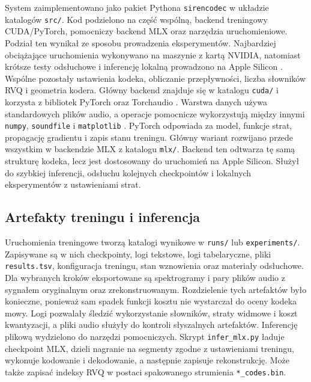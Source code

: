 System zaimplementowano jako pakiet Pythona \texttt{sirencodec} w układzie katalogów \texttt{src/}. Kod podzielono na część wspólną, backend treningowy CUDA/PyTorch, pomocniczy backend MLX oraz narzędzia uruchomieniowe. Podział ten wynikał ze sposobu prowadzenia eksperymentów. Najbardziej obciążające uruchomienia wykonywano na maszynie z kartą NVIDIA, natomiast krótsze testy odsłuchowe i inferencję lokalną prowadzono na Apple Silicon \cite{Apple2026MLX}. Wspólne pozostały ustawienia kodeka, obliczanie przepływności, liczba słowników RVQ i geometria kodera. Główny backend znajduje się w katalogu \texttt{cuda/} i korzysta z bibliotek PyTorch oraz Torchaudio \cite{Paszke2019PyTorch,PyTorch2026Torchaudio}. Warstwa danych używa standardowych plików audio, a operacje pomocnicze wykorzystują między innymi \texttt{numpy}, \texttt{soundfile} i \texttt{matplotlib} \cite{Harris2020ArrayProgramming,SoundFile2026Documentation,Hunter2007Matplotlib}. PyTorch odpowiada za model, funkcje strat, propagację gradientu i zapis stanu treningu. Główny wariant rozwijano przede wszystkim w backendzie MLX z katalogu \texttt{mlx/}. Backend ten odtwarza tę samą strukturę kodeka, lecz jest dostosowany do uruchomień na Apple Silicon. Służył do szybkiej inferencji, odsłuchu kolejnych checkpointów i lokalnych eksperymentów z ustawieniami strat.

\newpage

\subsection{Artefakty treningu i inferencja}

Uruchomienia treningowe tworzą katalogi wynikowe w \texttt{runs/} lub \texttt{experiments/}. Zapisywane są w nich checkpointy, logi tekstowe, logi tabelaryczne, pliki \texttt{results.tsv}, konfiguracja treningu, stan wznowienia oraz materiały odsłuchowe. Dla wybranych kroków eksportowane są spektrogramy i pary plików audio z sygnałem oryginalnym oraz zrekonstruowanym. Rozdzielenie tych artefaktów było konieczne, ponieważ sam spadek funkcji kosztu nie wystarczał do oceny kodeka mowy. Logi pozwalały śledzić wykorzystanie słowników, straty widmowe i koszt kwantyzacji, a pliki audio służyły do kontroli słyszalnych artefaktów. Inferencję plikową wydzielono do narzędzi pomocniczych. Skrypt \texttt{infer\_mlx.py} ładuje checkpoint MLX, dzieli nagranie na segmenty zgodne z ustawieniami treningu, wykonuje kodowanie i dekodowanie, a następnie zapisuje rekonstrukcję. Może także zapisać indeksy RVQ w postaci spakowanego strumienia \texttt{*\_codes.bin}.

